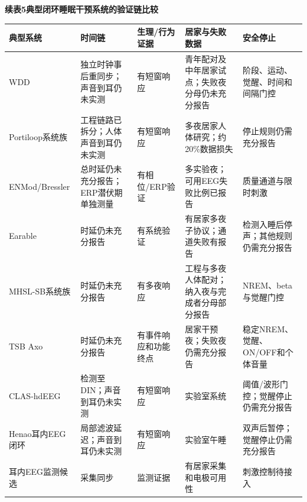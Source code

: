 \documentclass[UTF8,zihao=5,fontset=none]{ctexart}
\begin{document}
\begin{center}
\begin{minipage}{\textwidth}
\centering

\fontsize{7.5pt}{9pt}\selectfont

\setlength{\tabcolsep}{1.8pt}

\vspace{2pt}

{\bfseries 续表5\quad 典型闭环睡眠干预系统的验证链比较}\par

\vspace{2pt}

\begin{tabularx}{\textwidth}{>{\raggedright\arraybackslash}p{}>{\raggedright\arraybackslash}X>{\raggedright\arraybackslash}p{}>{\raggedright\arraybackslash}p{}>{\raggedright\arraybackslash}p{}}

\hline

典型系统 & 时间链 & 生理/行为证据 & 居家与失败数据 & 安全停止 \\

\hline

WDD & 独立时钟事后重同步；声音到耳仍未实测 & 有短窗响应 & 青年配对及中年居家试点；失败夜分母仍未充分报告 & 阶段、运动、觉醒、时间和间隔门控 \\

Portiloop系统族 & 工程链路已拆分；人体声音到耳仍未实测 & 有短窗响应 & 多夜居家人体研究；约20\%数据损失 & 停止规则仍需充分报告 \\

ENMod/Bressler & 总时延仍未充分报告；ERP潜伏期单独测量 & 有相位/ERP验证 & 多实验夜；可用EEG失败比例已报告 & 质量通道与限时刺激 \\

Earable & 时延仍未充分报告 & 有系统验证 & 有居家多夜子协议；通道失败有报告 & 检测入睡后停声；其他规则仍需充分报告 \\

MHSL-SB系统族 & 时延仍未充分报告 & 有多夜响应 & 工程与多夜人体配对；纳入夜与完成者分母部分报告 & NREM、beta与觉醒门控 \\

TSB Axo & 时延仍未充分报告 & 有事件响应和功能终点 & 居家干预夜；失败夜仍需充分报告 & 稳定NREM、觉醒、ON/OFF和个体音量 \\

CLAS-hdEEG & 检测至DIN；声音到耳仍未实测 & 有短窗响应 & 实验室系统 & 阈值/波形门控；觉醒停止仍需充分报告 \\

Henao耳内EEG闭环 & 局部滤波延迟；声音到耳仍未实测 & 有短窗响应 & 实验室午睡 & 双声后暂停；觉醒停止仍需充分报告 \\

耳内EEG监测候选 & 采集同步 & 监测证据 & 有居家采集和电极可用性 & 刺激控制待接入 \\

\hline

\end{tabularx}

\end{minipage}
\end{center}
\end{document}

